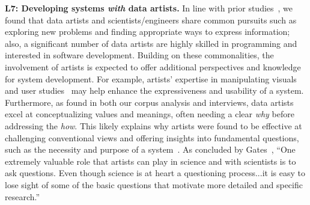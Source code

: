 \textbf{L7: Developing systems \textit{with} data artists.}
In line with prior studies~\cite{judelman2004aesthetics,samsel2013art,li2021we,sandin2006artist}, we found that data artists and scientists/engineers share common pursuits such as exploring new problems and finding appropriate ways to express information; also, a significant number of data artists are highly skilled in programming and interested in software development.
Building on these commonalities, the involvement of artists is expected to offer additional perspectives and knowledge for system development. For example, artists' expertise in manipulating visuals and user studies~\cite{tandon2023visual,sandin2006artist} may help enhance the expressiveness and usability of a system.
Furthermore, as found in both our corpus analysis and interviews, data artists excel at conceptualizing values and meanings, often needing a clear \textit{why} before addressing the \textit{how}. This likely explains why artists were found to be effective at challenging conventional views and offering insights into fundamental questions, such as the necessity and purpose of a system~\cite{laidlaw1998art,pousman2007casual}.
As concluded by Gates~\cite{gates2016art}, ``One extremely valuable role that artists can play in science and with scientists is to ask questions. Even though science is at heart a questioning process...it is easy to lose sight of some of the basic questions that motivate more detailed and specific research.'' 


